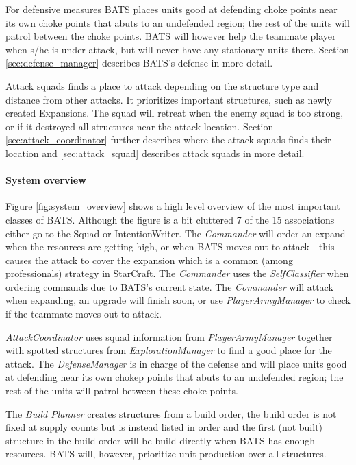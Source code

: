 For defensive measures BATS places units good at defending choke points near its own choke points that abuts to an undefended region; the rest of the units will patrol between the choke points. BATS will however help the teammate player when s/he is under attack, but will never have any stationary units there. Section \ref{sec:defense_manager}  describes BATS's defense in more detail.

Attack squads finds a place to attack depending on the structure type and distance from other attacks. It prioritizes important structures, such as newly created Expansions. The squad will retreat when the enemy squad is too strong, or if it destroyed all structures near the attack location. Section \ref{sec:attack_coordinator}  further describes where the attack squads finds their location and \ref{sec:attack_squad}  describes attack squads in more detail.

\paragraph{System overview}
Figure \ref{fig:system_overview} shows a high level overview of the most important classes of BATS. Although the figure is a bit cluttered 7 of the 15 associations either go to the Squad or IntentionWriter. The \emph{Commander} will order an expand when the resources are getting high, or when BATS moves out to attack—this causes the attack to cover the expansion which is a common (among professionals) strategy in StarCraft\cite{day9}. The \emph{Commander} uses the \emph{SelfClassifier} when ordering commands due to BATS's current state. The \emph{Commander} will attack when expanding, an upgrade will finish soon, or use \emph{PlayerArmyManager} to check if the teammate moves out to attack.

\emph{AttackCoordinator} uses squad information from \emph{PlayerArmyManager} together with spotted structures from \emph{ExplorationManager} to find a good place for the attack. The \emph{DefenseManager} is in charge of the defense and will place units good at defending near its own chokep points that abuts to an undefended region; the rest of the units will patrol between these choke points.

The \emph{Build Planner} creates structures from a build order, the build order is not fixed at supply counts but is instead listed in order and the first (not built) structure in the build order will be build directly when BATS has enough resources. BATS will, however, prioritize unit production over all structures.

